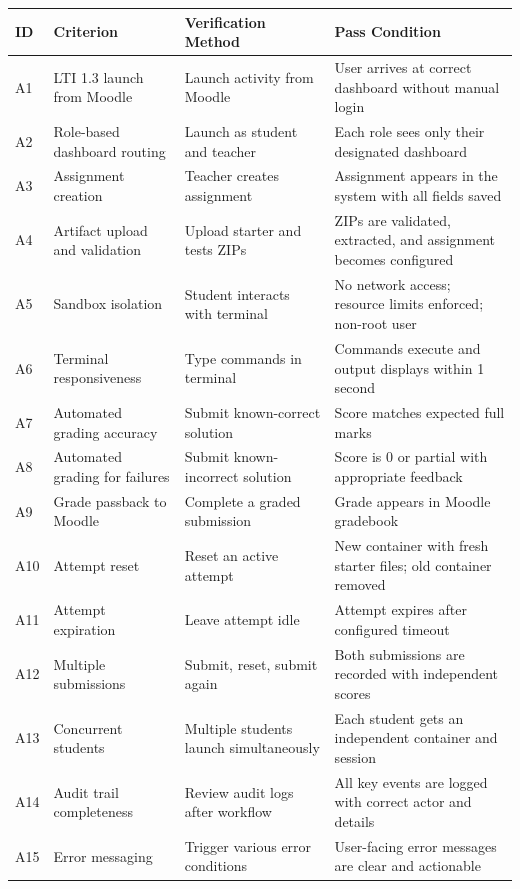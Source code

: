\documentclass[12pt, letterpaper]{article}
\begin{document}
\begin{longtable}{p{0.5cm} p{4cm} p{4cm} p{5cm}}
    \toprule
    \textbf{ID} & \textbf{Criterion} & \textbf{Verification Method} & \textbf{Pass Condition} \\
    \midrule
    A1 & LTI 1.3 launch from Moodle & Launch activity from Moodle & User arrives at correct dashboard without manual login \\
    A2 & Role-based dashboard routing & Launch as student and teacher & Each role sees only their designated dashboard \\
    A3 & Assignment creation & Teacher creates assignment & Assignment appears in the system with all fields saved \\
    A4 & Artifact upload and validation & Upload starter and tests ZIPs & ZIPs are validated, extracted, and assignment becomes configured \\
    A5 & Sandbox isolation & Student interacts with terminal & No network access; resource limits enforced; non-root user \\
    A6 & Terminal responsiveness & Type commands in terminal & Commands execute and output displays within 1 second \\
    A7 & Automated grading accuracy & Submit known-correct solution & Score matches expected full marks \\
    A8 & Automated grading for failures & Submit known-incorrect solution & Score is 0 or partial with appropriate feedback \\
    A9 & Grade passback to Moodle & Complete a graded submission & Grade appears in Moodle gradebook \\
    A10 & Attempt reset & Reset an active attempt & New container with fresh starter files; old container removed \\
    A11 & Attempt expiration & Leave attempt idle & Attempt expires after configured timeout \\
    A12 & Multiple submissions & Submit, reset, submit again & Both submissions are recorded with independent scores \\
    A13 & Concurrent students & Multiple students launch simultaneously & Each student gets an independent container and session \\
    A14 & Audit trail completeness & Review audit logs after workflow & All key events are logged with correct actor and details \\
    A15 & Error messaging & Trigger various error conditions & User-facing error messages are clear and actionable \\
    \bottomrule
\end{longtable}
\end{document}
